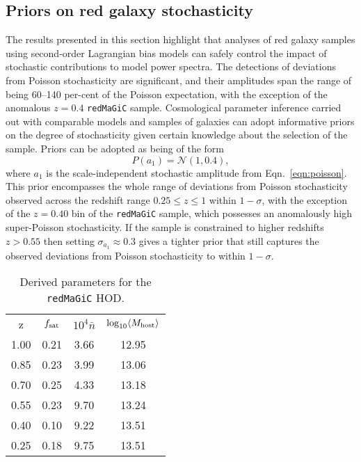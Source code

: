 \documentclass[fleqn,usenatbib]{mnras}
\newcommand{\redmagic}{\texttt{redMaGiC} }
\begin{document}
\subsection{Priors on red galaxy stochasticity}
\label{subsec:priors}
The results presented in this section highlight that analyses of red galaxy samples using second-order Lagrangian bias models can safely control the impact of stochastic contributions to model power spectra. The detections of deviations from Poisson stochasticity are significant, and their amplitudes span the range of being 60--140 per-cent of the Poisson expectation, with the exception of the anomalous $z=0.4$ \redmagic sample. Cosmological parameter inference carried out with comparable models and samples of galaxies can adopt informative priors on the degree of stochasticity given certain knowledge about the selection of the sample. Priors can be adopted as being of the form
\begin{equation}
    P(a_1) = \mathcal{N} \left(1, 0.4 \right ), 
\end{equation}
where $a_1$ is the scale-independent stochastic amplitude from Eqn.~\ref{eqn:poisson}. This prior encompasses the whole range of deviations from Poisson stochasticity observed across the redshift range $0.25 \leq z \leq 1$ within $1-\sigma$, with the exception of the $z=0.40$ bin of the \redmagic sample, which possesses an anomalously high super-Poisson stochasticity. If the sample is constrained to higher redshifts $z>0.55$ then setting $\sigma_{a_1} \approx 0.3$ gives a tighter prior that still captures the observed deviations from Poisson stochasticity to within $1-\sigma$. 
\begin{table}
\centering
\begin{tabular}{c c c c} 
 \hline \hline
 z & $f_{\rm sat}$ &  $10^4\bar{n}$ & $ \log_{10}\langle M_{\rm host} \rangle$\\ 
1.00 & 0.21  &  3.66  &  12.95  \\  
0.85 &0.23   & 3.99  &  13.06    \\
0.70 &0.25  &  4.33  &  13.18    \\
0.55 &0.23  &  9.70  &  13.24    \\
0.40 &0.10  &  9.22  &  13.51    \\
0.25 & 0.18   & 9.75 &   13.51    \\
 \hline \hline
\end{tabular}
\caption{Derived parameters for the \redmagic HOD.}
\label{table:redmagic}
\end{table}
\end{document}
